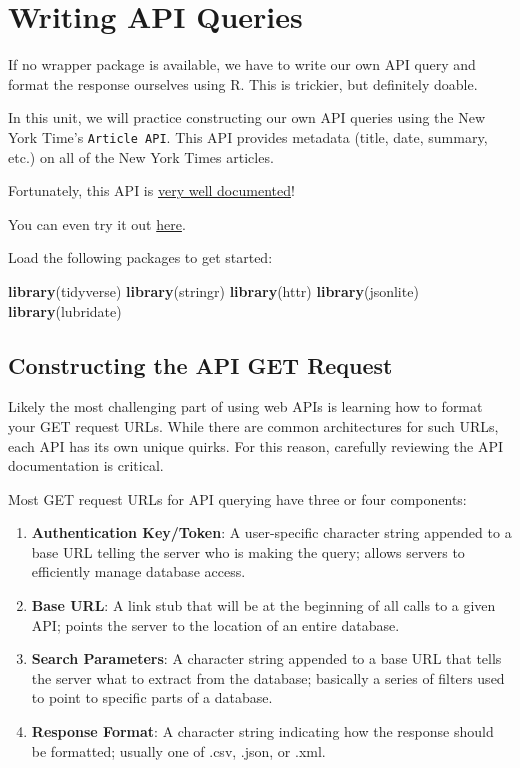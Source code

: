 \documentclass[]{book}
\newenvironment{Shaded}{\begin{snugshade}}{\end{snugshade}}
\newcommand{\KeywordTok}[1]{\textcolor[rgb]{0.13,0.29,0.53}{\textbf{#1}}}
\newcommand{\NormalTok}[1]{#1}
\begin{document}
\hypertarget{writing-api-queries}{\section{Writing API
Queries}\label{writing-api-queries}}

If no wrapper package is available, we have to write our own API query
and format the response ourselves using R. This is trickier, but
definitely doable.

In this unit, we will practice constructing our own API queries using
the New York Time's \texttt{Article\ API}. This API provides metadata
(title, date, summary, etc.) on all of the New York Times articles.

Fortunately, this API is
\href{https://developer.nytimes.com/docs/articlesearch-product/1/overview}{very
well documented}!

You can even try it out
\href{http://developer.nytimes.com/io-docs}{here}.

Load the following packages to get started:

\begin{Shaded}
\begin{Highlighting}[]
\KeywordTok{library}\NormalTok{(tidyverse)}
\KeywordTok{library}\NormalTok{(stringr)}
\KeywordTok{library}\NormalTok{(httr)}
\KeywordTok{library}\NormalTok{(jsonlite)}
\KeywordTok{library}\NormalTok{(lubridate)}
\end{Highlighting}
\end{Shaded}

\subsection{Constructing the API GET
Request}\label{constructing-the-api-get-request}

Likely the most challenging part of using web APIs is learning how to
format your GET request URLs. While there are common architectures for
such URLs, each API has its own unique quirks. For this reason,
carefully reviewing the API documentation is critical.

Most GET request URLs for API querying have three or four components:

\begin{enumerate}
\def\labelenumi{\arabic{enumi}.}
\item
  \textbf{Authentication Key/Token}: A user-specific character string
  appended to a base URL telling the server who is making the query;
  allows servers to efficiently manage database access.
\item
  \textbf{Base URL}: A link stub that will be at the beginning of all
  calls to a given API; points the server to the location of an entire
  database.
\item
  \textbf{Search Parameters}: A character string appended to a base URL
  that tells the server what to extract from the database; basically a
  series of filters used to point to specific parts of a database.
\item
  \textbf{Response Format}: A character string indicating how the
  response should be formatted; usually one of .csv, .json, or .xml.
\end{enumerate}
\end{document}
